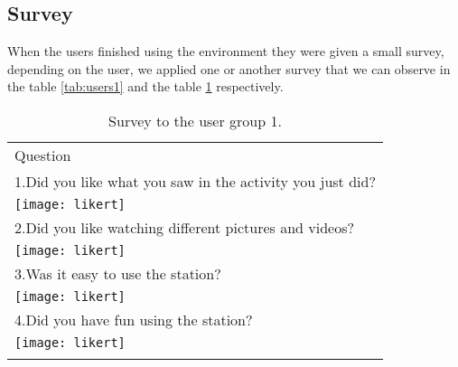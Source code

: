 \subsection{Survey}
When the users finished using the environment they were given a small survey, depending on the user, we applied one or another survey that we can observe in the table \ref{tab:users1} and the table \ref{tab:users2} respectively.
\begin{table}
\small
\centering
\captionsetup{font=footnotesize}
\caption{Survey to the user group 1.}
\label{tab:users2} 

\small
\begin{tabular}{p{12cm}}
\hline\noalign{\smallskip} 
Question \\
\noalign{\smallskip}\hline\noalign{\smallskip}\hline
\small{1.Did you like what you saw in the activity you just did? } \\ 
\texttt{[image: likert]}\\ \hline  
\small{2.Did you like watching different pictures and videos? }  \\ 
\texttt{[image: likert]}\\ \hline 
\small{3.Was it easy to use the station?  } \\ 
\texttt{[image: likert]}\\ \hline  
\small{4.Did you have fun using the station?   } \\ 
\texttt{[image: likert]}\\    

\hline
\noalign{\smallskip}\hline
\end{tabular}
\end{table}

